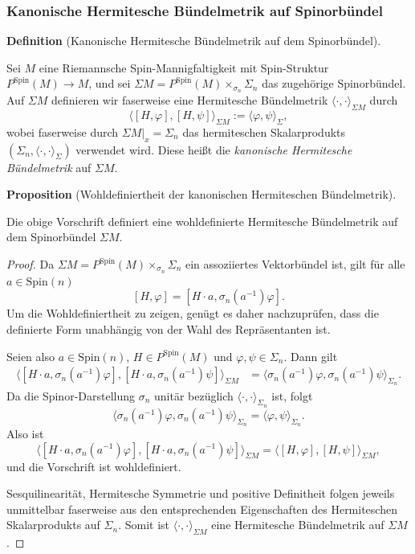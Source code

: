 \documentclass[10pt, letterpaper]{article}
\newcommand{\Spin}{\mathrm{Spin}}
\newcommand{\CustomHeading}[3]{%
  \par\medskip\noindent%
  \textbf{#1 #2} \textnormal{(#3)}.\enskip%
}
\newenvironment{DEF}[2]{\CustomHeading{Definition}{#1}{#2}}{}
\newenvironment{PROP}[2]{\CustomHeading{Proposition}{#1}{#2}}{}
\begin{document}
\subsubsection{Kanonische Hermitesche Bündelmetrik auf Spinorbündel}

\begin{DEF}{}{Kanonische Hermitesche Bündelmetrik auf dem Spinorbündel}
Sei \(M\) eine Riemannsche Spin-Mannigfaltigkeit mit Spin-Struktur $P^{\Spin}(M)\to M$, und sei $\Sigma M=P^{\Spin}(M)\times_{\sigma_n}\Sigma_n$
das zugehörige Spinorbündel. Auf \(\Sigma M\) definieren wir faserweise eine
Hermitesche Bündelmetrik $\langle\cdot,\cdot\rangle_{\Sigma M}$ durch
\[
\bigl\langle [H,\varphi],[H,\psi]\bigr\rangle_{\Sigma M}
:=
\langle \varphi,\psi\rangle_{\Sigma},
\]
wobei faserweise durch $\Sigma M|_x=\Sigma_n$ das hermiteschen Skalarprodukts $(\Sigma_n,\langle\cdot,\cdot\rangle_\Sigma)$ verwendet wird. Diese heißt die
\emph{kanonische Hermitesche Bündelmetrik} auf \(\Sigma M\).
\end{DEF}

\begin{PROP}{}{Wohldefiniertheit der kanonischen Hermiteschen Bündelmetrik}
Die obige Vorschrift definiert eine wohldefinierte Hermitesche Bündelmetrik auf
dem Spinorbündel \(\Sigma M\).
\end{PROP}

\begin{proof}
Da \(\Sigma M=P^{\Spin}(M)\times_{\sigma_n}\Sigma_n\) ein assoziiertes
Vektorbündel ist, gilt für alle \(a\in \Spin(n)\)
\[
[H,\varphi]=[H\cdot a,\sigma_n(a^{-1})\varphi].
\]
Um die Wohldefiniertheit zu zeigen, genügt es daher nachzuprüfen, dass die
definierte Form unabhängig von der Wahl des Repräsentanten ist.

Seien also \(a\in \Spin(n)\), \(H\in P^{\Spin}(M)\) und \(\varphi,\psi\in \Sigma_n\).
Dann gilt
\[
\begin{aligned}
\bigl\langle [H\cdot a,\sigma_n(a^{-1})\varphi],
[H\cdot a,\sigma_n(a^{-1})\psi]\bigr\rangle_{\Sigma M}
&=
\bigl\langle \sigma_n(a^{-1})\varphi,\sigma_n(a^{-1})\psi\bigr\rangle_{\Sigma_n}.
\end{aligned}
\]
Da die Spinor-Darstellung \(\sigma_n\) unitär bezüglich
\(\langle\cdot,\cdot\rangle_{\Sigma_n}\) ist, folgt
\[
\bigl\langle \sigma_n(a^{-1})\varphi,\sigma_n(a^{-1})\psi\bigr\rangle_{\Sigma_n}
=
\langle \varphi,\psi\rangle_{\Sigma_n}.
\]
Also ist
\[
\bigl\langle [H\cdot a,\sigma_n(a^{-1})\varphi],
[H\cdot a,\sigma_n(a^{-1})\psi]\bigr\rangle_{\Sigma M}
=
\bigl\langle [H,\varphi],[H,\psi]\bigr\rangle_{\Sigma M},
\]
und die Vorschrift ist wohldefiniert.

Sesquilinearität, Hermitesche Symmetrie und positive Definitheit folgen jeweils
unmittelbar faserweise aus den entsprechenden Eigenschaften des Hermiteschen
Skalarprodukts auf \(\Sigma_n\). Somit ist \(\langle\cdot,\cdot\rangle_{\Sigma M}\)
eine Hermitesche Bündelmetrik auf \(\Sigma M\).
\end{proof}
\end{document}
